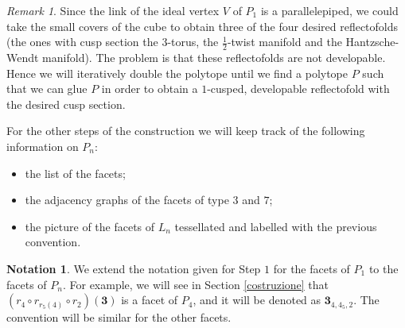 \documentclass{amsart}
\makeatletter
\newcommand{\mylabel}[2]{#2\def\@currentlabel{#2}\label{#1}}
\theoremstyle{definition}
\newtheorem{notat}[lemma]{Notation}
\theoremstyle{remark}
\newtheorem{rem}[lemma]{Remark}
\newcommand{\lk}{L}
\makeatother
\begin{document}



\begin{rem}
\label{motivazione}
    Since the link of the ideal vertex $V$ of $P_1$ is a parallelepiped, we could take the small covers of the cube \cite[Section 3]{FKS} to obtain three of the four desired reflectofolds (the ones with cusp section the $3$-torus, the $\frac{1}{2}$-twist manifold and the Hantzsche-Wendt manifold). The problem is that these reflectofolds are not developable. Hence we will iteratively double the polytope until we find a polytope $P$ such that we can glue $P$ in order to obtain a $1$-cusped, developable reflectofold with the desired cusp section.
\end{rem}


For the other steps of the construction we will keep track of the following information on $P_n$:
\begin{itemize}
    \item[\mylabel{item:I1}{(I1)}] the list of the facets;
    \item[\mylabel{item:I2}{(I2)}] the adjacency graphs of the facets of type $3$ and $7$;
    \item[\mylabel{item:I3}{(I3)}] the picture of the facets of $L_n$ tessellated and labelled with the previous convention.
\end{itemize}

\begin{notat}
     We extend the notation given for Step $1$ for the facets of $P_1$ to the facets of $P_n$. For example, we will see in Section \ref{costruzione} that $(r_4\circ r_{r_5(4)} \circ r_2) (\textbf{3})$ is a facet of $P_4$, and it will be denoted as $\textbf{3}_{4,4_5,2}$. The convention will be similar for the other facets.
\end{notat}
\end{document}
